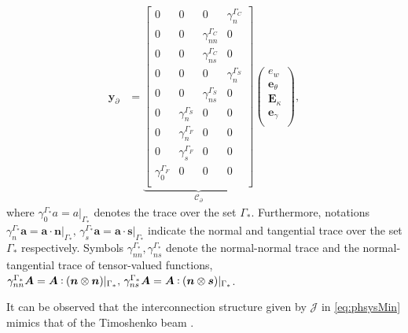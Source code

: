 \begin{equation}
\begin{aligned}
\bm{y}_\partial &= \underbrace{
\begin{bmatrix}
{0} & {0} & {0} & \gamma_{n}^{\Gamma_C} \\
{0} & {0} & \gamma_{nn}^{\Gamma_C} & {0} \\
{0} & {0} & \gamma_{ns}^{\Gamma_C} & {0} \\
{0} & {0} & {0} & \gamma_{n}^{\Gamma_S} \\
{0} & {0} & \gamma_{ns}^{\Gamma_S} & {0} \\
{0} & \gamma_{n}^{\Gamma_S} & {0} & {0} \\
{0} & \gamma_{n}^{\Gamma_F} & {0} & {0} \\
{0} & \gamma_{s}^{\Gamma_F} & {0} & {0} \\
\gamma_{0}^{\Gamma_F} & {0} & {0} & {0} \\
\end{bmatrix}}_{\mathcal{C}_\partial}
\begin{pmatrix}
e_w \\
\bm{e}_{\theta} \\
\bm{E}_{\kappa} \\
\bm{e}_{\gamma} \\
\end{pmatrix},
\end{aligned}
\end{equation}
where $\gamma_{0}^{\Gamma_*}a = a\vert_{\Gamma_*}$ denotes the trace over the set $\Gamma_*$. Furthermore, notations $\gamma_{n}^{\Gamma_*}\bm{a} = \bm{a} \cdot \bm{n}\vert_{\Gamma_*}, \,  \gamma_{s}^{\Gamma_*}\bm{a}= \bm{a} \cdot \bm{s}\vert_{\Gamma_*}$ indicate the normal and tangential trace over the set $\Gamma_*$ respectively. Symbols $\gamma_{nn}^{\Gamma_*}, \gamma_{ns}^{\Gamma_*}$ denote the normal-normal trace and the normal-tangential trace of tensor-valued functions, $\gamma_{nn}^{\Gamma_*}\bm{A} = \bm{A} \cddot (\bm{n} \otimes \bm{n})\vert_{\Gamma_*}, \, \gamma_{ns}^{\Gamma_*}\bm{A} = \bm{A} \cddot (\bm{n} \otimes \bm{s})\vert_{\Gamma_*}$.

\begin{remark}
	It can be observed that the interconnection structure given by $\mathcal{J}$ in \eqref{eq:phsysMin} mimics that of the Timoshenko beam \cite[Chapter 7]{zwart2012}.
\end{remark}

